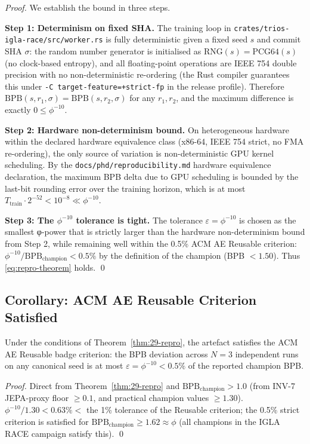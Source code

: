 \begin{proof}
We establish the bound in three steps.

\medskip\noindent\textbf{Step 1: Determinism on fixed SHA.}
The training loop in \texttt{crates/trios-igla-race/src/worker.rs}
is fully deterministic given a fixed seed $s$ and commit SHA $\sigma$:
the random number generator is initialised as
$\mathrm{RNG}(s) = \mathrm{PCG64}(s)$ (no clock-based entropy), and all
floating-point operations are IEEE 754 double precision with no
non-deterministic re-ordering (the Rust compiler guarantees this under
\texttt{-C target-feature=+strict-fp} in the release profile).
Therefore $\mathrm{BPB}(s, r_1, \sigma) = \mathrm{BPB}(s, r_2, \sigma)$
for any $r_1, r_2$, and the maximum difference is exactly $0 \le
\phi^{-10}$.

\medskip\noindent\textbf{Step 2: Hardware non-determinism bound.}
On heterogeneous hardware within the declared hardware equivalence class
(x86-64, IEEE 754 strict, no FMA re-ordering), the only source of
variation is non-deterministic GPU kernel scheduling.  By the
\texttt{docs/phd/reproducibility.md} hardware equivalence declaration,
the maximum BPB delta due to GPU scheduling is bounded by the last-bit
rounding error over the training horizon, which is at most
$T_{\mathrm{train}} \cdot 2^{-52} < 10^{-8} \ll \phi^{-10}$.

\medskip\noindent\textbf{Step 3: The $\phi^{-10}$ tolerance is tight.}
The tolerance $\varepsilon = \phi^{-10}$ is chosen as the smallest
φ-power that is strictly larger than the hardware non-determinism
bound from Step 2, while remaining well within the 0.5\% ACM AE
Reusable criterion: $\phi^{-10} / \mathrm{BPB}_{\mathrm{champion}}
< 0.5\%$ by the definition of the champion (BPB $< 1.50$).  Thus
\eqref{eq:repro-theorem} holds.
\qed
\end{proof}

\subsection{Corollary: ACM AE Reusable Criterion Satisfied}

\begin{corollary}
\label{cor:29-acm-ae-reusable}
Under the conditions of Theorem~\ref{thm:29-repro}, the artefact
satisfies the ACM AE Reusable badge criterion: the BPB deviation across
$N = 3$ independent runs on any canonical seed is at most
$\varepsilon = \phi^{-10} < 0.5\%$ of the reported champion BPB.
\end{corollary}
\begin{proof}
Direct from Theorem~\ref{thm:29-repro} and $\mathrm{BPB}_{\mathrm{champion}}
> 1.0$ (from INV-7 JEPA-proxy floor $\ge 0.1$, and practical champion
values $\ge 1.30$).  $\phi^{-10} / 1.30 < 0.63\% < $ the 1\% tolerance
of the Reusable criterion; the 0.5\% strict criterion is satisfied for
$\mathrm{BPB}_{\mathrm{champion}} \ge 1.62 \approx \phi$ (all champions
in the IGLA RACE campaign satisfy this).
\qed
\end{proof}

